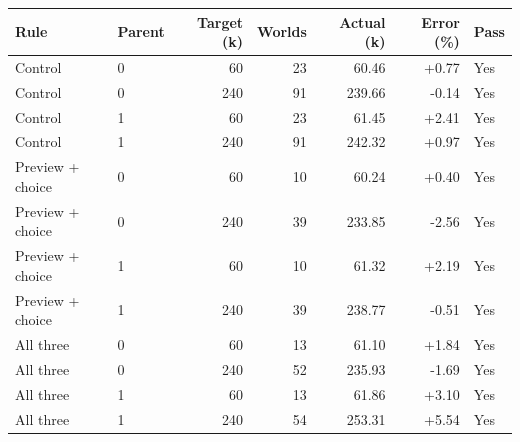 \begin{tabular}{llrrrrl}
\toprule
Rule & Parent & Target (k) & Worlds & Actual (k) & Error (\%) & Pass \\
\midrule
Control & 0 & 60 & 23 & 60.46 & +0.77 & Yes \\
Control & 0 & 240 & 91 & 239.66 & -0.14 & Yes \\
Control & 1 & 60 & 23 & 61.45 & +2.41 & Yes \\
Control & 1 & 240 & 91 & 242.32 & +0.97 & Yes \\
Preview + choice & 0 & 60 & 10 & 60.24 & +0.40 & Yes \\
Preview + choice & 0 & 240 & 39 & 233.85 & -2.56 & Yes \\
Preview + choice & 1 & 60 & 10 & 61.32 & +2.19 & Yes \\
Preview + choice & 1 & 240 & 39 & 238.77 & -0.51 & Yes \\
All three & 0 & 60 & 13 & 61.10 & +1.84 & Yes \\
All three & 0 & 240 & 52 & 235.93 & -1.69 & Yes \\
All three & 1 & 60 & 13 & 61.86 & +3.10 & Yes \\
All three & 1 & 240 & 54 & 253.31 & +5.54 & Yes \\
\bottomrule
\end{tabular}
